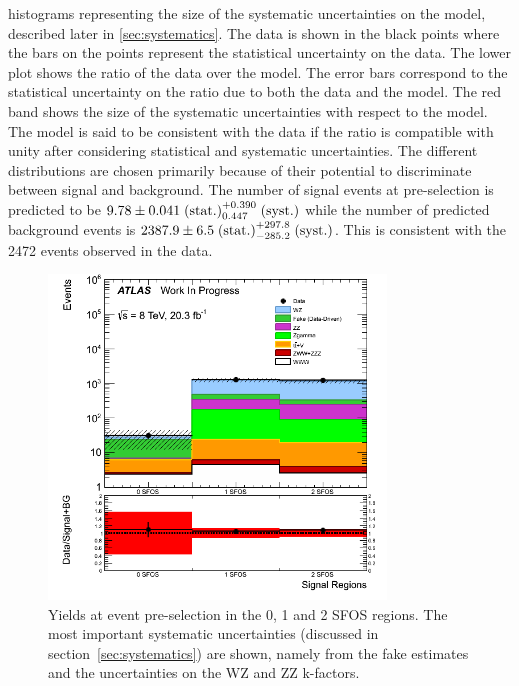 histograms representing the size of the systematic uncertainties 
on the model, described later in \sec\ref{sec:systematics}.
The data is shown in the black points where the 
bars on the points represent the statistical uncertainty on the data.
The lower plot shows the ratio of the data over the model.
The error bars correspond to the statistical uncertainty
on the ratio due to both the data and the model. The red band
shows the size of the systematic uncertainties with respect to the model.
The model is said to be consistent with the data
if the ratio is compatible with unity after considering statistical
and systematic uncertainties.
The different distributions are chosen primarily because 
of their potential to discriminate between signal and background. 
The number of signal events at pre-selection is predicted to be 
$9.78 \pm 0.041 \mbox{$\;$(stat.)} ^{+0.390}_{0.447} \mbox{$\;$(syst.)}$
while the number of predicted background events is 
$2387.9 \pm 6.5 \mbox{$\;$(stat.)} ^{+297.8}_{-285.2} \mbox{$\;$(syst.)}$. 
This is consistent with the 2472 events observed in the data.




%



\begin{figure}[ht!]
\centering
\includegraphics[width=0.8\textwidth]{figures/SFOSPreselection.png}
\caption{Yields at event pre-selection in the 0, 1 and 2 SFOS regions.  
The most important systematic uncertainties 
(discussed in section~\ref{sec:systematics}) are shown, 
namely from the fake estimates and the uncertainties on the WZ and ZZ k-factors.}
\label{fig:preselection_nsfos}
\end{figure}

